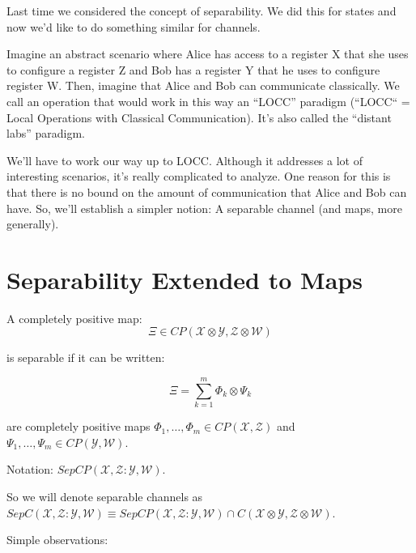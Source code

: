 \documentclass{article}
\begin{document}
Last time we considered the concept of separability. We did this for states
and now we'd like to do something similar for channels.

Imagine an abstract scenario where Alice has access to a register X that she
uses to configure a register Z and Bob has a register Y that he uses to
configure register W. Then, imagine that Alice and Bob can communicate
classically. We call an operation that would work in this way an ``LOCC''
paradigm (``LOCC`` = Local Operations with Classical Communication). It's
also called the ``distant labs'' paradigm.

We'll have to work our way up to LOCC. Although it addresses a lot of
interesting scenarios, it's really complicated to analyze. One reason for
this is that there is no bound on the amount of communication that Alice and
Bob can have. So, we'll establish a simpler notion: A separable channel (and
maps, more generally).

\section*{Separability Extended to Maps}
A completely positive map:
\[ 
        \Xi \in CP(\mathcal{X}\otimes \mathcal{Y},\mathcal{Z} \otimes
        \mathcal{W} )
\]

is separable if it can be written:

\[ 
        \Xi = \sum_{k=1}^m \Phi_k \otimes \Psi_k 
\]

are completely positive maps $\Phi_1, \ldots, \Phi_m \in
CP(\mathcal{X},\mathcal{Z})$ and $\Psi_1, \ldots, \Psi_m \in
CP(\mathcal{Y},\mathcal{W})$.

Notation: $SepCP(\mathcal{X},\mathcal{Z}:\mathcal{Y},\mathcal{W})$.

So we will denote separable channels as
$SepC(\mathcal{X},\mathcal{Z}:\mathcal{Y},\mathcal{W}) \equiv
SepCP(\mathcal{X},\mathcal{Z}:\mathcal{Y},\mathcal{W}) \cap
C(\mathcal{X}\otimes\mathcal{Y},\mathcal{Z}\otimes \mathcal{W})$.

Simple observations:
\end{document}
